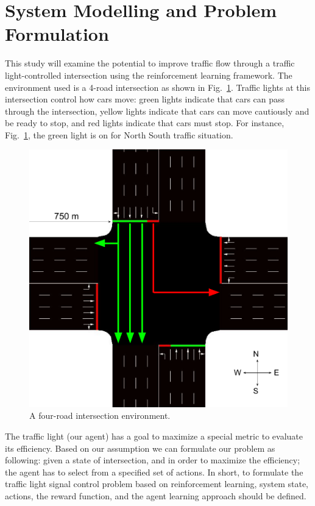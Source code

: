 \documentclass[conference]{IEEEtran}
\begin{document}
\section{System Modelling and Problem Formulation}\label{System modelling}
This study will examine the potential to improve traffic flow through a traffic light-controlled intersection using the reinforcement learning framework. 
The environment used is a 4-road intersection as shown in Fig.~\ref{fig:1}. 
Traffic lights at this intersection control how cars move: green lights indicate that cars can pass through the intersection, yellow lights indicate that cars can move cautiously and be ready to stop, and red lights indicate that cars must stop.
For instance, Fig.~\ref{fig:1}, the green light is on for North South traffic situation. 

\begin{figure}[ht]
    \centering
    \begin{center}
    \includegraphics[scale=0.5]{images/Intersection.pdf}
    \end{center}
    \caption{A four-road intersection environment.}
    \label{fig:1}
\end{figure}

The traffic light (our agent) has a goal to maximize a special metric to evaluate its efficiency. Based on our assumption we can formulate our problem as following: given a state of intersection, and in order to maximize the efficiency; the agent has to select from a specified set of actions. In short, to formulate the traffic light signal control problem based on reinforcement learning, system state, actions, the reward function, and the agent learning approach should be defined. 
\end{document}
